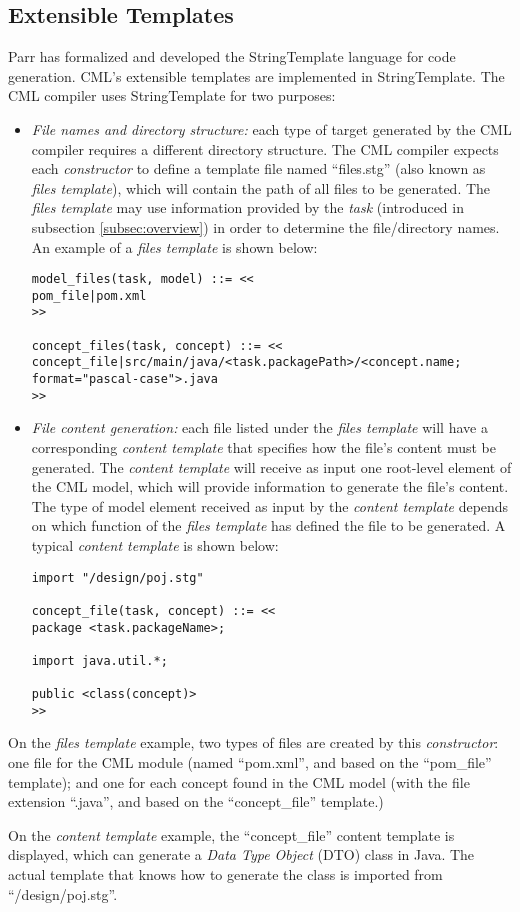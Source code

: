 \subsection{Extensible Templates}\label{subsec:templates}

Parr has formalized and developed the StringTemplate \cite{st} language for code generation.
CML's extensible templates are implemented in StringTemplate.
The CML compiler uses StringTemplate for two purposes:

\begin{itemize}

\item \emph{File names and directory structure:}
each type of target generated by the CML compiler requires a different directory structure.
The CML compiler expects each \emph{constructor} to define a template file named ``files.stg''
(also known as \emph{files template}),
which will contain the path of all files to be generated.
The \emph{files template} may use information provided by the \emph{task}
(introduced in subsection \ref{subsec:overview})
in order to determine the file/directory names.
An example of a \emph{files template} is shown below:
\verbatimfont{\scriptsize}
\begin{verbatim}
model_files(task, model) ::= <<
pom_file|pom.xml
>>

concept_files(task, concept) ::= <<
concept_file|src/main/java/<task.packagePath>/<concept.name; format="pascal-case">.java
>>
\end{verbatim}

\item \emph{File content generation:}
each file listed under the \emph{files template} will have a corresponding \emph{content template}
that specifies how the file's content must be generated.
The \emph{content template} will receive as input one root-level element of the CML model,
which will provide information to generate the file's content.
The type of model element received as input by the \emph{content template} depends on
which function of the \emph{files template} has defined the file to be generated.
A typical \emph{content template} is shown below:
\verbatimfont{\scriptsize}
\begin{verbatim}
import "/design/poj.stg"

concept_file(task, concept) ::= <<
package <task.packageName>;

import java.util.*;

public <class(concept)>
>>
\end{verbatim}

\end{itemize}

On the \emph{files template} example,
two types of files are created by this \emph{constructor}:
one file for the CML module (named ``pom.xml'', and based on the ``pom\_file'' template);
and one for each concept found in the CML model
(with the file extension ``.java'', and based on the ``concept\_file'' template.)

On the \emph{content template} example, the ``concept\_file'' content template is displayed,
which can generate a \emph{Data Type Object} (DTO) class in Java.
The actual template that knows how to generate the class is imported from ``/design/poj.stg''.
